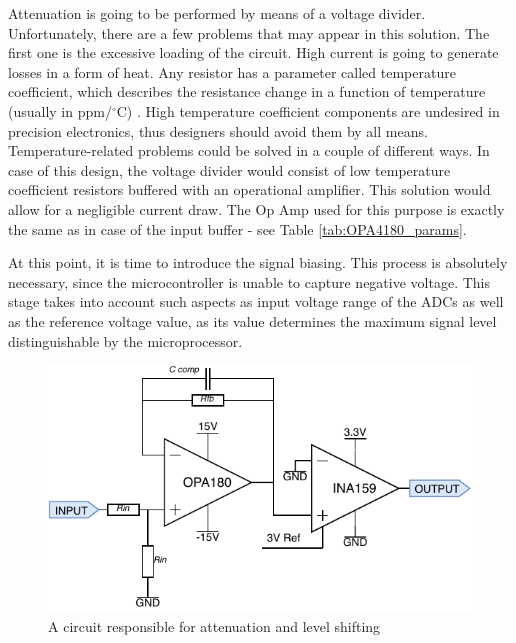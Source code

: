 \documentclass[12pt,a4paper]{article}
\begin{document}
Attenuation is going to be performed by means of a voltage divider. Unfortunately, there are a few problems that may appear in this solution. The first one is the excessive loading of the circuit. High current is going to generate losses in a form of heat. Any resistor has a parameter called temperature coefficient, which describes the resistance change in a function of temperature (usually in ppm/$^\circ$C) \cite{housekeeping}. High temperature coefficient components are undesired in precision electronics, thus designers should avoid them by all means.   Temperature-related problems could be solved in a couple of different ways. In case of this design, the voltage divider would consist of low temperature coefficient resistors buffered with an operational amplifier. This solution would allow for a negligible current draw. The Op Amp used for this purpose is exactly the same as in case of the input buffer - see Table \ref{tab:OPA4180_params}.
\par

At this point, it is time to introduce the signal biasing. This process is absolutely necessary, since the microcontroller is unable to capture negative voltage. This stage takes into account such aspects as input voltage range of the ADCs as well as the reference voltage value, as its value determines the maximum signal level distinguishable by the microprocessor.

\begin{figure}[ht!]
\includegraphics[scale=1.2]{input2.pdf}
\caption{A circuit responsible for attenuation and level shifting}
\label{fig:input2}
\end{figure}


\newpage

 

\end{document}
